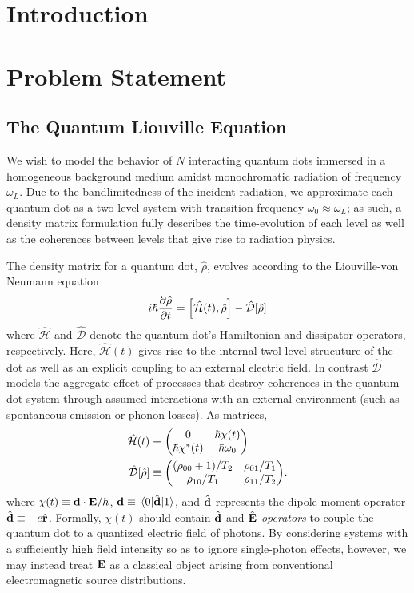 \documentclass[conference]{IEEEtran}
\begin{document}
\IEEEpeerreviewmaketitle

\section{Introduction}


\section{Problem Statement}

\subsection{The Quantum Liouville Equation}
We wish to model the behavior of $N$ interacting quantum dots immersed in a homogeneous background medium amidst monochromatic radiation of frequency $\omega_L$.
Due to the bandlimitedness of the incident radiation, we approximate each quantum dot as a two-level system with transition frequency $\omega_0 \approx \omega_L$; as such, a density matrix formulation fully describes the time-evolution of each level as well as the coherences between levels that give rise to radiation physics.

The density matrix for a quantum dot, $\hat{\rho}$, evolves according to the Liouville-von Neumann equation
\begin{equation}
  i \hbar \pdv{\hat{\rho}}{t} = \commutator{\hat{\mathcal{H}}(t)}{\hat{\rho}} - \hat{\mathcal{D}}\qty[\hat{\rho}]
  \label{eq:liouville}
\end{equation}
where $\hat{\mathcal{H}}$ and $\hat{\mathcal{D}}$ denote the quantum dot's Hamiltonian and dissipator operators, respectively.
Here, $\hat{\mathcal{H}}(t)$ gives rise to the internal twol-level strucuture of the dot as well as an explicit coupling to an external electric field.
In contrast $\hat{\mathcal{D}}$ models the aggregate effect of processes that destroy coherences in the quantum dot system through assumed interactions with an external environment (such as spontaneous emission or phonon losses).
As matrices,
\begin{subequations}
  \begin{align}
    \hat{\mathcal{H}}(t) &\equiv \mqty(0 & \hbar \chi(t) \\ \hbar \chi^*(t) & \hbar \omega_0) \label{eq:hamiltonian} \\
    \hat{\mathcal{D}}[\hat{\rho}] &\equiv \mqty((\rho_{00} + 1)/T_2 & \rho_{01}/T_1 \\ \rho_{10}/T_1 & \rho_{11}/T_2). \label{eq:dissipator}
  \end{align}
\end{subequations}
where $\chi(t) \equiv \vb{d} \cdot \vb{E}/\hbar$, $\vb{d} \equiv \matrixel{0}{\hat{\vb{d}}}{1}$, and $\hat{\vb{d}}$ represents the dipole moment operator $\hat{\vb{d}} \equiv -e \hat{\vb{r}}$. 
Formally, $\chi(t)$ should contain $\hat{\vb{d}}$ and $\hat{\vb{E}}$ \emph{operators} to couple the quantum dot to a quantized electric field of photons.
By considering systems with a sufficiently high field intensity so as to ignore single-photon effects, however, we may instead treat $\vb{E}$ as a classical object arising from conventional electromagnetic source distributions.
\end{document}
